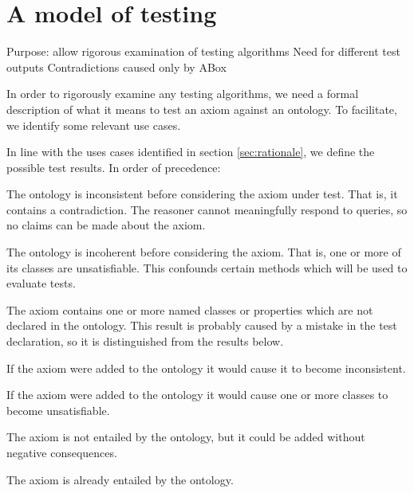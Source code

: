 \documentclass[paper.tex]{subfiles}
\begin{document}
\section{A model of testing}
\label{sec:model}

\begin{todos}
  \todo Purpose: allow rigorous examination of testing algorithms
  \todo Need for different test outputs
  \todo Contradictions caused only by ABox
\end{todos}

In order to rigorously examine any testing algorithms, we need a formal description of what it means to test an axiom against an ontology.  To facilitate, we identify some relevant use cases.

In line with the uses cases identified in section \ref{sec:rationale}, we define the possible test results.  In order of precedence:
\begin{description}[
  before={\renewcommand\makelabel[1]{\normalfont\itshape##1:}},
  labelindent=1em,
  leftmargin=2em,
  nosep,
]
  \item[Ontology already inconsistent]  The ontology is inconsistent before considering the axiom under test.  That is, it contains a contradiction.  The reasoner cannot meaningfully respond to queries, so no claims can be made about the axiom.
  \item[Ontology already incoherent]  The ontology is incoherent before considering the axiom.  That is, one or more of its classes are unsatisfiable.  This confounds certain methods which will be used to evaluate tests.
  \item[Missing entity in axiom]  The axiom contains one or more named classes or properties which are not declared in the ontology.  This result is probably caused by a mistake in the test declaration, so it is distinguished from the results below.
  \item[Axiom causes inconsistency]  If the axiom were added to the ontology it would cause it to become inconsistent.
  \item[Axiom causes incoherence]  If the axiom were added to the ontology it would cause one or more classes to become unsatisfiable.
  \item[Axiom absent]  The axiom is not entailed by the ontology, but it could be added without negative consequences.
  \item[Axiom entailed]  The axiom is already entailed by the ontology.
\end{description}
\end{document}

